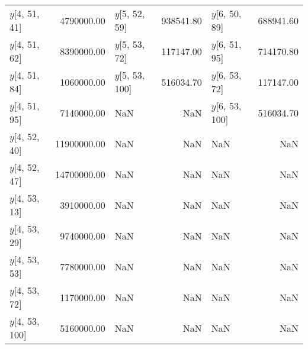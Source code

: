 \begin{longtable}{lrlrlr}
$y$[4, 51, 41] & 4790000.00 & $y$[5, 52, 59] & 938541.80 & $y$[6, 50, 89] & 688941.60 \\
$y$[4, 51, 62] & 8390000.00 & $y$[5, 53, 72] & 117147.00 & $y$[6, 51, 95] & 714170.80 \\
$y$[4, 51, 84] & 1060000.00 & $y$[5, 53, 100] & 516034.70 & $y$[6, 53, 72] & 117147.00 \\
$y$[4, 51, 95] & 7140000.00 & NaN & NaN & $y$[6, 53, 100] & 516034.70 \\
$y$[4, 52, 40] & 11900000.00 & NaN & NaN & NaN & NaN \\
$y$[4, 52, 47] & 14700000.00 & NaN & NaN & NaN & NaN \\
$y$[4, 53, 13] & 3910000.00 & NaN & NaN & NaN & NaN \\
$y$[4, 53, 29] & 9740000.00 & NaN & NaN & NaN & NaN \\
$y$[4, 53, 53] & 7780000.00 & NaN & NaN & NaN & NaN \\
$y$[4, 53, 72] & 1170000.00 & NaN & NaN & NaN & NaN \\
$y$[4, 53, 100] & 5160000.00 & NaN & NaN & NaN & NaN \\
\end{longtable}

